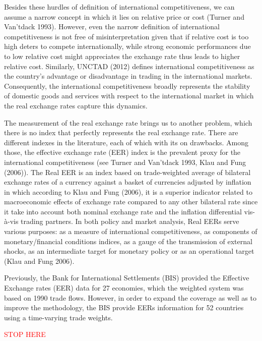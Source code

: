 \documentclass[]{elsarticle} %
\begin{document}
Besides these hurdles of definition of international competitiveness, we
can assume a narrow concept in which it lies on relative price or cost
(Turner and Van'tdack 1993). However, even the narrow definition of
international competitiveness is not free of misinterpretation given
that if relative cost is too high deters to compete internationally,
while strong economic performances due to low relative cost might
appreciates the exchange rate thus leads to higher relative cost.
Similarly, UNCTAD (2012) defines international competitiveness as the
country's advantage or disadvantage in trading in the international
markets. Consequently, the international competitiveness broadly
represents the stability of domestic goods and services with respect to
the international market in which the real exchange rates capture this
dynamics.

The measurement of the real exchange rate brings us to another problem,
which there is no index that perfectly represents the real exchange
rate. There are different indexes in the literature, each of which with
its on drawbacks. Among those, the effective exchange rate (EER) index
is the prevalent proxy for the international competitiveness (see Turner
and Van'tdack 1993, Klau and Fung (2006)). The Real EER is an index
based on trade-weighted average of bilateral exchange rates of a
currency against a basket of currencies adjusted by inflation in which
according to Klau and Fung (2006), it is a superior indicator related to
macroeconomic effects of exchange rate compared to any other bilateral
rate since it take into account both nominal exchange rate and the
inflation differential vis-à-vis trading partners. In both policy and
market analysis, Real EERs serve various purposes: as a measure of
international competitiveness, as components of monetary/financial
conditions indices, as a gauge of the transmission of external shocks,
as an intermediate target for monetary policy or as an operational
target (Klau and Fung 2006).

Previously, the Bank for International Settlements (BIS) provided the
Effective Exchange rates (EER) data for 27 economies, which the weighted
system was based on 1990 trade flows. However, in order to expand the
coverage as well as to improve the methodology, the BIS provide EERs
information for 52 countries using a time-varying trade weights.

\textcolor{red}{STOP HERE}
\end{document}

